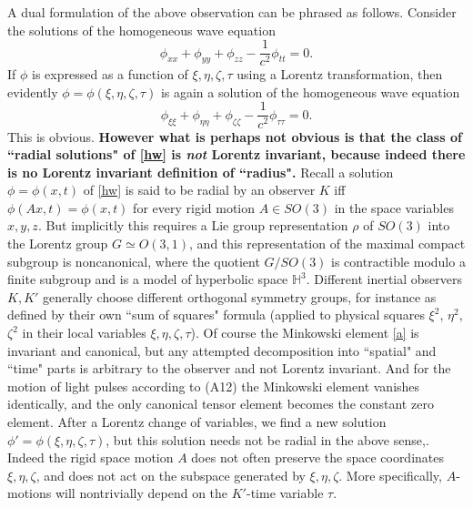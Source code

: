 \documentclass[12pt]{amsart}
\theoremstyle{definition}
\theoremstyle{remark}
\newcommand{\bH}{\mathbb{H}}
\begin{document}
A dual formulation of the above observation can be phrased as follows. Consider the solutions of the homogeneous wave equation 
\begin{equation} \label{hw}
\phi_{xx}+\phi_{yy}+\phi_{zz}-\frac{1}{c^2}\phi_{tt}=0.
\end{equation} 
If $\phi$ is expressed as a function of $\xi, \eta, \zeta, \tau$ using a Lorentz transformation, then evidently $\phi=\phi(\xi, \eta, \zeta, \tau)$ is again a solution of the homogeneous wave equation $$\phi_{\xi \xi}+\phi_{\eta \eta}+\phi_{\zeta \zeta}-\frac{1}{c^2}\phi_{\tau \tau}=0.$$ This is obvious. \textbf{However what is perhaps not obvious is that the class of ``radial solutions" of \eqref{hw} is \emph{not} Lorentz invariant, because indeed there is no Lorentz invariant definition of ``radius".} Recall a solution $\phi=\phi(x,t)$ of \eqref{hw} is said to be radial by an observer $K$ iff $\phi(Ax,t)=\phi(x,t)$ for every rigid motion $A\in SO(3)$ in the space variables $x,y,z$. But implicitly this requires a Lie group representation $\rho$ of $SO(3)$ into the Lorentz group $G\simeq O(3,1)$, and this representation of the maximal compact subgroup is noncanonical, where the quotient $G/SO(3)$ is contractible modulo a finite subgroup and is a model of hyperbolic space $\bH^3$. Different inertial observers $K, K'$ generally choose different orthogonal symmetry groups, for instance as defined by their own ``sum of squares" formula (applied to physical squares $\xi^2$, $\eta^2$, $\zeta^2$ in their local variables $\xi, \eta, \zeta, \tau$). Of course the Minkowski element \eqref{a} is invariant and canonical, but any attempted decomposition into ``spatial" and ``time" parts is arbitrary to the observer and not Lorentz invariant. And for the motion of light pulses according to (A12) the Minkowski element vanishes identically, and the only canonical tensor element becomes the constant zero element. After a Lorentz change of variables, we find a new solution $\phi'=\phi(\xi, \eta, \zeta, \tau)$, but this solution needs not be radial in the above sense,. Indeed the rigid space motion $A$ does not often preserve the space coordinates $\xi, \eta, \zeta$, and does not act on the subspace generated by $\xi, \eta, \zeta$. More specifically, $A$-motions will nontrivially depend on the $K'$-time variable $\tau$.


\end{document}
